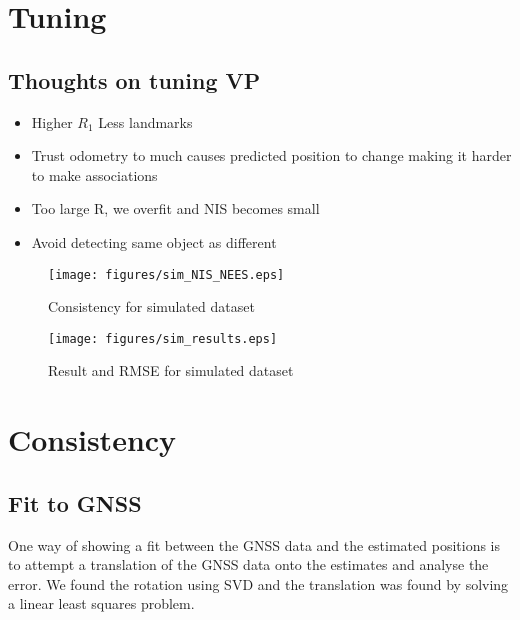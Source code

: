 \section{Tuning}\label{sec:tuning}


\subsection{Thoughts on tuning VP}


\begin{itemize}
    \item Higher $R_1$ Less landmarks
    \item Trust odometry to much causes predicted position to change making it harder to make associations
    \item Too large R, we overfit and NIS becomes small
    \item Avoid detecting same object as different
\end{itemize}



\begin{figure}
    \centering
    \texttt{[image: figures/sim\_NIS\_NEES.eps]}
    \caption{Consistency for simulated dataset}
	\label{fig:1_1}
\end{figure}
\begin{figure}
    \centering
    \texttt{[image: figures/sim\_results.eps]}
    \caption{Result and RMSE for simulated dataset}
	\label{fig:1_2}
\end{figure}


\section{Consistency}

\subsection{Fit to GNSS}

One way of showing a fit between the GNSS data and the estimated 
positions is to attempt a translation of the GNSS data onto the estimates
and analyse the error. We found the rotation using SVD and the translation
was found by solving a linear least squares problem.

\begin{align*}
    
\end{align*}